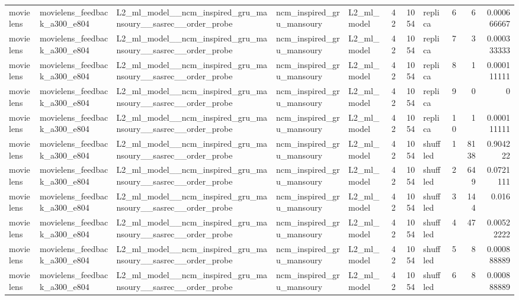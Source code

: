 \begin{table}[htbp!]
\begin{tabular}{lllllrrlrrr}
movielens & movielens\_feedback\_a300\_e804 & L2\_ml\_model\_\_ncm\_inspired\_gru\_mansoury\_\_sasrec\_\_order\_probe & ncm\_inspired\_gru\_mansoury & L2\_ml\_model & 42 & 1054 & replica & 6 & 6 & 0.000666667 \\
movielens & movielens\_feedback\_a300\_e804 & L2\_ml\_model\_\_ncm\_inspired\_gru\_mansoury\_\_sasrec\_\_order\_probe & ncm\_inspired\_gru\_mansoury & L2\_ml\_model & 42 & 1054 & replica & 7 & 3 & 0.000333333 \\
movielens & movielens\_feedback\_a300\_e804 & L2\_ml\_model\_\_ncm\_inspired\_gru\_mansoury\_\_sasrec\_\_order\_probe & ncm\_inspired\_gru\_mansoury & L2\_ml\_model & 42 & 1054 & replica & 8 & 1 & 0.000111111 \\
movielens & movielens\_feedback\_a300\_e804 & L2\_ml\_model\_\_ncm\_inspired\_gru\_mansoury\_\_sasrec\_\_order\_probe & ncm\_inspired\_gru\_mansoury & L2\_ml\_model & 42 & 1054 & replica & 9 & 0 & 0 \\
movielens & movielens\_feedback\_a300\_e804 & L2\_ml\_model\_\_ncm\_inspired\_gru\_mansoury\_\_sasrec\_\_order\_probe & ncm\_inspired\_gru\_mansoury & L2\_ml\_model & 42 & 1054 & replica & 10 & 1 & 0.000111111 \\
movielens & movielens\_feedback\_a300\_e804 & L2\_ml\_model\_\_ncm\_inspired\_gru\_mansoury\_\_sasrec\_\_order\_probe & ncm\_inspired\_gru\_mansoury & L2\_ml\_model & 42 & 1054 & shuffled & 1 & 8138 & 0.904222 \\
movielens & movielens\_feedback\_a300\_e804 & L2\_ml\_model\_\_ncm\_inspired\_gru\_mansoury\_\_sasrec\_\_order\_probe & ncm\_inspired\_gru\_mansoury & L2\_ml\_model & 42 & 1054 & shuffled & 2 & 649 & 0.0721111 \\
movielens & movielens\_feedback\_a300\_e804 & L2\_ml\_model\_\_ncm\_inspired\_gru\_mansoury\_\_sasrec\_\_order\_probe & ncm\_inspired\_gru\_mansoury & L2\_ml\_model & 42 & 1054 & shuffled & 3 & 144 & 0.016 \\
movielens & movielens\_feedback\_a300\_e804 & L2\_ml\_model\_\_ncm\_inspired\_gru\_mansoury\_\_sasrec\_\_order\_probe & ncm\_inspired\_gru\_mansoury & L2\_ml\_model & 42 & 1054 & shuffled & 4 & 47 & 0.00522222 \\
movielens & movielens\_feedback\_a300\_e804 & L2\_ml\_model\_\_ncm\_inspired\_gru\_mansoury\_\_sasrec\_\_order\_probe & ncm\_inspired\_gru\_mansoury & L2\_ml\_model & 42 & 1054 & shuffled & 5 & 8 & 0.000888889 \\
movielens & movielens\_feedback\_a300\_e804 & L2\_ml\_model\_\_ncm\_inspired\_gru\_mansoury\_\_sasrec\_\_order\_probe & ncm\_inspired\_gru\_mansoury & L2\_ml\_model & 42 & 1054 & shuffled & 6 & 8 & 0.000888889 \\

\end{tabular}
\end{table}
